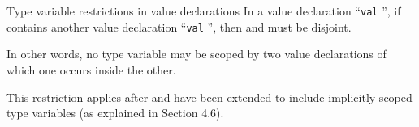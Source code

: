 \begin{clause}{Type variable restrictions in value declarations}
In a value declaration ``\texttt{val}  '', if
 contains another value declaration ``\texttt{val} 
'', then  and  must be disjoint.

In other words, no type variable may be scoped by two value declarations
of which one occurs inside the other.

This restriction applies after  and  have been
extended to include implicitly scoped type variables (as explained in
Section 4.6).
\end{clause}